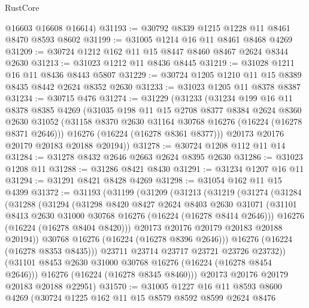 \begin{lexlean}{RustCore}
\begin{coremodule}
      @16603
      @16608
      @16614)
@31193 := @30792 @8339 @1215 @1228 @11 @8461 @8470 @8593 @8602
@31199 := @31005 @1214 @16 @11 @8461 @8468 @4269
@31209 := @30724 @1212 @162 @11 @15 @8447 @8460 @8467 @2624 @8344 @2630
@31213 := @31023 @1212 @11 @8436 @8445
@31219 := @31028 @1211 @16 @11 @8436 @8443 @5807
@31229 := @30724 @1205 @1210 @11 @15 @8389 @8435 @8442 @2624 @8352 @2630
@31233 := @31023 @1205 @11 @8378 @8387
@31234 := @30715 @476
@31274 := @31229
    (@31233
      (@31234
        @199
        @16
        @11
        @8378
        @8385
        @4269
        (@31035
          @198
          @11
          @15
          @2708
          @8377
          @8384
          @2624
          @8360
          @2630
          @31052
          (@31158 @8370 @2630 @31164 @30768 @16276 (@16224 (@16278 @8371 @2646)))
          @16276
          (@16224 (@16278 @8361 @8377)))
        @20173
        @20176
        @20179
        @20183
        @20188
        @20194))
@31278 := @30724 @1208 @112 @11 @14
@31284 := @31278 @8432 @2646 @2663 @2624 @8395 @2630
@31286 := @31023 @1208 @11
@31288 := @31286 @8421 @8430
@31291 := @31234 @1207 @16 @11
@31294 := @31291 @8421 @8428 @4269
@31298 := @31054 @162 @11 @15 @4399
@31372 := @31193
    (@31199
      (@31209
        (@31213
          (@31219
            (@31274
              (@31284
                (@31288
                  (@31294
                    (@31298
                      @8420
                      @8427
                      @2624
                      @8403
                      @2630
                      @31071
                      (@31101 @8413 @2630 @31000 @30768 @16276 (@16224 (@16278 @8414 @2646)))
                      @16276
                      (@16224 (@16278 @8404 @8420)))
                    @20173
                    @20176
                    @20179
                    @20183
                    @20188
                    @20194))
                @30768
                @16276
                (@16224 (@16278 @8396 @2646)))
              @16276
              (@16224 (@16278 @8353 @8435)))
            @23711
            @23714
            @23717
            @23721
            @23726
            @23732))
        (@31101 @8453 @2630 @31000 @30768 @16276 (@16224 (@16278 @8454 @2646)))
        @16276
        (@16224 (@16278 @8345 @8460)))
      @20173
      @20176
      @20179
      @20183
      @20188
      @22951)
@31570 := @31005
    @1227
    @16
    @11
    @8593
    @8600
    @4269
    (@30724
      @1225
      @162
      @11
      @15
      @8579
      @8592
      @8599
      @2624
      @8476

\end{coremodule}
\end{lexlean}
